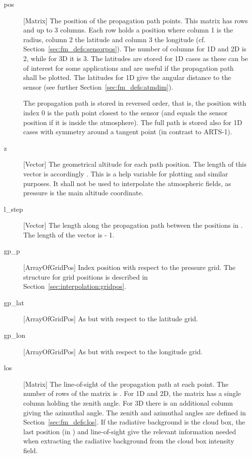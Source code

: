\begin{description}
   \item[pos] [Matrix] The position of the propagation path points.
     This matrix has  rows and up to 3 columns. Each row
     holds a position where column 1 is the radius, column 2 the
     latitude and column 3 the longitude (cf.
     Section~\ref{sec:fm_defs:sensorpos}). The number of columns for
     1D and 2D is 2, while for 3D it is 3. The latitudes are stored
     for 1D cases as these can be of interest for some applications
     and are useful if the propagation path shall be plotted. The
     latitudes for 1D give the angular distance to the sensor (see
     further Section~\ref{sec:fm_defs:atmdim}).
     
     The propagation path is stored in reversed order, that is, the
     position with index 0 is the path point closest to the sensor
     (and equals the sensor position if it is inside the atmosphere).
     The full path is stored also for 1D cases with symmetry around a
     tangent point (in contrast to ARTS-1). 
     
  \item[z] [Vector] The geometrical altitude for each path position. The
     length of this vector is accordingly . This is a help
     variable for plotting and similar purposes. It shall not be used to
     interpolate the atmospheric fields, as pressure is the main altitude
     coordinate.

  \item[l\_step] [Vector] The length along the propagation path between
     the positions in . The length of the vector is
      - 1. 
     
   \item[gp\_p] [ArrayOfGridPos] Index position with respect to the
     pressure grid. The structure for grid positions is described in
     Section~\ref{sec:interpolation:gridpos}. 
     
   \item[gp\_lat] [ArrayOfGridPos] As  but with
     respect to the latitude grid.

   \item[gp\_lon] [ArrayOfGridPos] As  but with
     respect to the longitude grid.
     
   \item[los] [Matrix] The line-of-sight of the propagation path at
     each point. The number of rows of the matrix is .
     For 1D and 2D, the matrix has a single column holding the zenith
     angle. For 3D there is an additional column giving the azimuthal
     angle. The zenith and azimuthal angles are defined in
     Section~\ref{sec:fm_defs:los}. If the radiative background is the
     cloud box, the last position (in ) and
     line-of-sight give the relevant information needed when
     extracting the radiative background from the cloud box intensity
     field.
     

\end{description}
